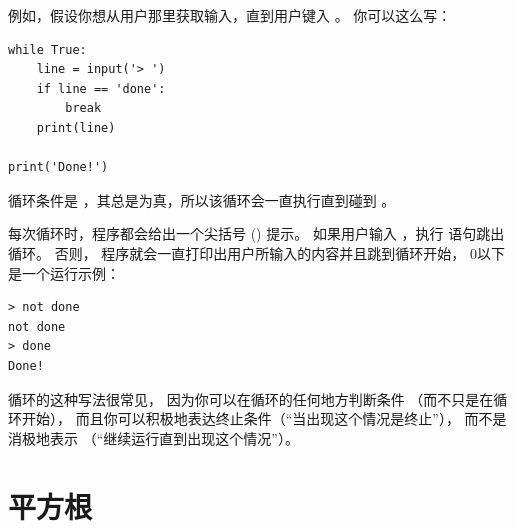 例如，假设你想从用户那里获取输入，直到用户键入 。 你可以这么写：

\begin{lstlisting}
while True:
    line = input('> ')
    if line == 'done':
        break
    print(line)

print('Done!')
\end{lstlisting}

%

循环条件是 ，其总是为真，所以该循环会一直执行直到碰到 。


每次循环时，程序都会给出一个尖括号 (\li{>}) 提示。 如果用户输入 ，执行  语句跳出循环。 否则， 程序就会一直打印出用户所输入的内容并且跳到循环开始， 0以下是一个运行示例：


\begin{lstlisting}
> not done
not done
> done
Done!
\end{lstlisting}

%

 循环的这种写法很常见， 因为你可以在循环的任何地方判断条件
（而不只是在循环开始）， 而且你可以积极地表达终止条件（``当出现这个情况是终止''）， 而不是消极地表示 （``继续运行直到出现这个情况''）。


\section{平方根}
\label{squareroot}
  


